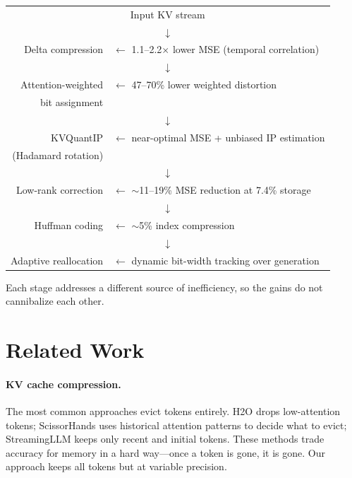 \documentclass[11pt]{article}
\begin{document}
\begin{center}
\begin{tabular}{rl}
  \multicolumn{2}{c}{Input KV stream} \\
  \multicolumn{2}{c}{$\downarrow$} \\
  Delta compression & $\leftarrow$ 1.1--2.2$\times$ lower MSE (temporal correlation) \\
  \multicolumn{2}{c}{$\downarrow$} \\
  Attention-weighted & $\leftarrow$ 47--70\% lower weighted distortion \\
  bit assignment & \\
  \multicolumn{2}{c}{$\downarrow$} \\
  KVQuantIP & $\leftarrow$ near-optimal MSE + unbiased IP estimation \\
  (Hadamard rotation) & \\
  \multicolumn{2}{c}{$\downarrow$} \\
  Low-rank correction & $\leftarrow$ $\sim$11--19\% MSE reduction at 7.4\% storage \\
  \multicolumn{2}{c}{$\downarrow$} \\
  Huffman coding & $\leftarrow$ $\sim$5\% index compression \\
  \multicolumn{2}{c}{$\downarrow$} \\
  Adaptive reallocation & $\leftarrow$ dynamic bit-width tracking over generation \\
\end{tabular}
\end{center}

Each stage addresses a different source of inefficiency, so the gains do not
cannibalize each other.

\section{Related Work}

\paragraph{KV cache compression.}
The most common approaches evict tokens entirely. H2O \citep{zhang2023h2o}
drops low-attention tokens; ScissorHands \citep{liu2023scissorhands} uses
historical attention patterns to decide what to evict; StreamingLLM
\citep{xiao2024streaming} keeps only recent and initial tokens. These
methods trade accuracy for memory in a hard way---once a token is gone, it
is gone. Our approach keeps all tokens but at variable precision.
\end{document}
